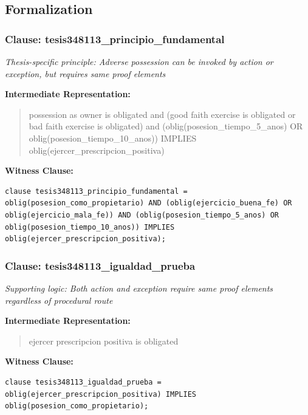 \documentclass[11pt,a4paper]{article}
\begin{document}
\subsection{Formalization}

\subsubsection{Clause: tesis348113\_principio\_fundamental}

\textit{Thesis-specific principle: Adverse possession can be invoked by action or exception, but requires same proof elements}

\textbf{Intermediate Representation:}

\begin{quote}
possession as owner is obligated and (good faith exercise is obligated or bad faith exercise is obligated) and (oblig(posesion\_tiempo\_5\_anos) OR oblig(posesion\_tiempo\_10\_anos)) IMPLIES oblig(ejercer\_prescripcion\_positiva)
\end{quote}

\textbf{Witness Clause:}

\begin{lstlisting}[style=witnessstyle, language=Witness]
clause tesis348113_principio_fundamental = oblig(posesion_como_propietario) AND (oblig(ejercicio_buena_fe) OR oblig(ejercicio_mala_fe)) AND (oblig(posesion_tiempo_5_anos) OR oblig(posesion_tiempo_10_anos)) IMPLIES oblig(ejercer_prescripcion_positiva);
\end{lstlisting}

\subsubsection{Clause: tesis348113\_igualdad\_prueba}

\textit{Supporting logic: Both action and exception require same proof elements regardless of procedural route}

\textbf{Intermediate Representation:}

\begin{quote}
ejercer prescripcion positiva is obligated
\end{quote}

\textbf{Witness Clause:}

\begin{lstlisting}[style=witnessstyle, language=Witness]
clause tesis348113_igualdad_prueba = oblig(ejercer_prescripcion_positiva) IMPLIES oblig(posesion_como_propietario);
\end{lstlisting}
\end{document}
